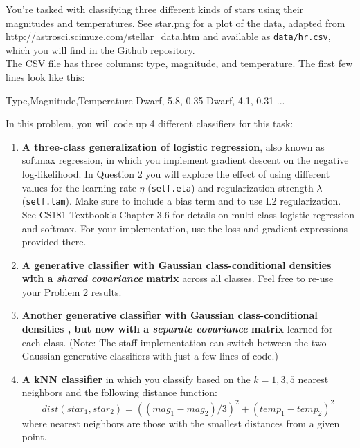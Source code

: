 \documentclass[submit]{harvardml}
\begin{document}
\begin{problem}

You're tasked with classifying three different kinds of stars using their magnitudes and temperatures. See star.png for a plot of
the data, adapted from
\url{http://astrosci.scimuze.com/stellar_data.htm} and available as
\verb|data/hr.csv|, which you will find in the Github repository. \\

The CSV file has three columns: type, magnitude, and temperature. The
first few lines look like this:
\begin{csv}
Type,Magnitude,Temperature
Dwarf,-5.8,-0.35
Dwarf,-4.1,-0.31
...
\end{csv}

In this problem, you will code up 4 different classifiers for this task:
\begin{enumerate}[label=\alph*)]

\item \textbf{A three-class generalization of logistic regression},
  also known as softmax regression, in which you implement gradient
  descent on the negative log-likelihood. In Question 2 you will
  explore the effect of using different values for the learning rate
  $\eta$ (\texttt{self.eta}) and regularization strength $\lambda$
  (\texttt{self.lam}).  Make sure to include a bias term and to use L2
  regularization. See CS181 Textbook's Chapter 3.6 for details on  multi-class logistic regression and softmax. For your implementation, use the loss and gradient expressions provided there.

\item \textbf{A generative classifier with Gaussian class-conditional
  densities with a \textit{shared covariance} matrix} across all classes. 
  Feel free to re-use your Problem 2 results.
\item \textbf{Another generative classifier with Gaussian class-conditional densities , but now 
with a \textit{separate covariance} matrix} learned for each class. (Note: 
The staff implementation can switch between the two Gaussian generative classifiers with just a
few lines of code.)

\item \textbf{A kNN classifier} in which you classify based on the $k=1,3,5$ nearest neighbors and the following distance function: $$dist(star_1, star_2) = ((mag_1 - mag_2)/3)^2 + (temp_1 - temp_2)^2$$
where nearest neighbors are those with the smallest distances from a given point.


\end{enumerate}
\end{problem}
\end{document}
